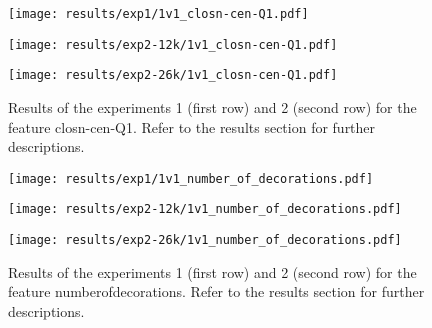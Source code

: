 \begin{figure}[h!]
    \centering
	\begin{minipage}{0.3\linewidth}
		\texttt{[image: results/exp1/1v1\_closn-cen-Q1.pdf]}
	\end{minipage}

	\begin{minipage}{0.3\linewidth}
		\texttt{[image: results/exp2-12k/1v1\_closn-cen-Q1.pdf]}
	\end{minipage}
	\begin{minipage}{0.3\linewidth}
		\texttt{[image: results/exp2-26k/1v1\_closn-cen-Q1.pdf]}
	\end{minipage}

	\caption[ Results: Feature closn-cen-Q1]{ Results of the experiments 1 (first row) and 2 (second row) for the feature closn-cen-Q1. Refer to the results section for further descriptions. }
	\label{fig:appendix_closn-cen-Q1}
\end{figure}
 \newpage 

 
\begin{figure}[h!]
    \centering
	\begin{minipage}{0.3\linewidth}
		\texttt{[image: results/exp1/1v1\_number\_of\_decorations.pdf]}
	\end{minipage}

	\begin{minipage}{0.3\linewidth}
		\texttt{[image: results/exp2-12k/1v1\_number\_of\_decorations.pdf]}
	\end{minipage}
	\begin{minipage}{0.3\linewidth}
		\texttt{[image: results/exp2-26k/1v1\_number\_of\_decorations.pdf]}
	\end{minipage}

	\caption[ Results: Feature number\textunderscore of\textunderscore decorations]{ Results of the experiments 1 (first row) and 2 (second row) for the feature number\textunderscore of\textunderscore decorations. Refer to the results section for further descriptions. }
	\label{fig:appendix_number_of_decorations}
\end{figure}
 
